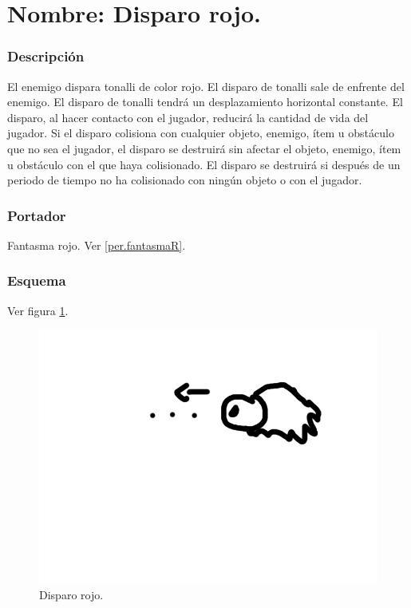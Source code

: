 		\section{Nombre: Disparo rojo.} \label{hab.disparoR}
		\subsubsection{Descripción}
El enemigo dispara tonalli de color rojo. El disparo de tonalli sale de enfrente del enemigo. El disparo de tonalli tendrá un desplazamiento horizontal constante. El disparo, al hacer contacto con el jugador, reducirá la cantidad de vida del jugador. Si el disparo colisiona con cualquier objeto, enemigo, ítem u obstáculo que no sea el jugador, el disparo se destruirá sin afectar el objeto, enemigo, ítem u obstáculo con el que haya colisionado. El disparo se destruirá si después de un periodo de tiempo no ha colisionado con ningún objeto o con el jugador.
		\subsubsection{Portador}
		Fantasma rojo. Ver \ref{per.fantasmaR}.
		\subsubsection{Esquema}
		Ver figura \ref{fig:disparoR}.
		\begin{figure}
			\centering
			\includegraphics[height=0.2 \textheight]{Imagenes/disparoR}
			\caption{Disparo rojo.}
			\label{fig:disparoR}
		\end{figure}